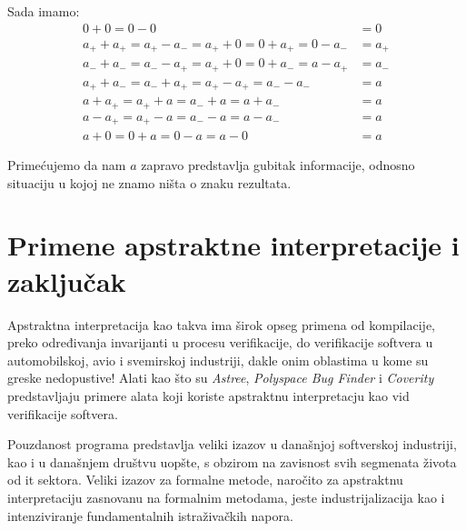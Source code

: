 \documentclass[a4paper]{article}
\begin{document}
Sada imamo:
\begin{align*}
    0 + 0 = 0 - 0 &= 0 \\
    a_+ + a_+ = a_+ - a_- = a_+ + 0 = 0 + a_+ = 0 - a_- &= a_+ \\
    a_- + a_- = a_- - a_+ = a_+ + 0 = 0 + a_- = a - a_+ &= a_- \\
    a_+ + a_- = a_- + a_+ = a_+ - a_+ = a_- - a_- &= a \\
    a + a_+ = a_+ + a = a_- + a = a + a_- &= a \\
    a - a_+ = a_+ - a = a_- - a = a - a_- &= a \\
    a + 0 = 0 + a = 0 - a = a - 0 &= a
\end{align*}

Primećujemo da nam $a$ zapravo predstavlja gubitak informacije, odnosno situaciju u kojoj ne znamo ništa o znaku rezultata.

\section{Primene apstraktne interpretacije i zaključak}

Apstraktna interpretacija kao takva ima širok opseg primena od kompilacije, preko određivanja invarijanti u procesu verifikacije, do verifikacije softvera u automobilskoj, avio i svemirskoj industriji, dakle onim oblastima u kome su greske nedopustive! Alati kao što su \textit{Astree}, \textit{Polyspace Bug Finder} i \textit{Coverity} predstavljaju primere alata koji koriste apstraktnu interpretacju kao vid verifikacije softvera. \cite{mvj}\newline

Pouzdanost programa predstavlja veliki izazov u današnjoj softverskoj industriji, kao i u današnjem društvu uopšte, s obzirom na zavisnost svih segmenata života od it sektora. Veliki izazov za formalne metode, naročito za apstraktnu interpretaciju zasnovanu na formalnim metodama, jeste industrijalizacija kao i intenziviranje fundamentalnih istraživačkih napora. \cite{pcousot1}





\clearpage
{}
\appendix
 

\end{document}
